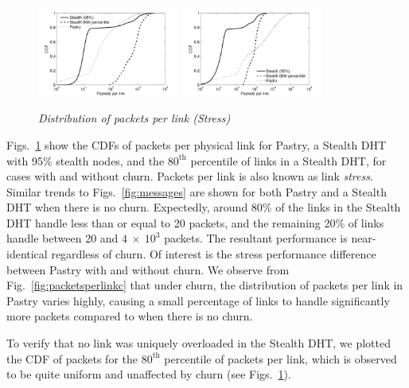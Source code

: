 \documentclass[letterpaper]{sig-alternate} %
\begin{document}
\begin{figure}[tb]\centering
\center {}%
    {\includegraphics[width=0.415\textwidth]{./diagrams/packets_per_link}
    \label{fig:packetsperlink}}
    {\includegraphics[width=0.415\textwidth]{./diagrams/packets_per_link_churn}
    \label{fig:packetsperlinkc}}
\caption{\em Distribution of packets per link (Stress)}
\label{fig:packets}
\end{figure}

Figs.~\ref{fig:packets} show the CDFs of packets per physical link for
Pastry, a Stealth DHT with 95\% stealth nodes, and the $80^\mathrm{th}$
percentile of links in a Stealth DHT, for cases with and without churn.
Packets per link is also known as link {\em stress}. Similar trends to
Figs.~\ref{fig:messages} are shown for both Pastry and a Stealth DHT
when there is no churn. Expectedly, around 80\% of the links in the
Stealth DHT handle less than or equal to 20 packets, and the remaining
20\% of links handle between 20 and $4~\times~10^3$ packets. The
resultant performance is near-identical regardless of churn. Of
interest is the stress performance difference between Pastry with and
without churn. We observe from Fig.~\ref{fig:packetsperlinkc} that
under churn, the distribution of packets per link in Pastry varies
highly, causing a small percentage of links to handle significantly
more packets compared to when there is no churn.

To verify that no link was uniquely overloaded in the Stealth DHT, we
plotted the CDF of packets for the $80^\mathrm{th}$ percentile of
packets per link, which is observed to be quite uniform and  unaffected
by churn (see Figs.~\ref{fig:packets}).
\end{document}

